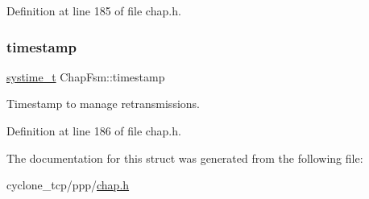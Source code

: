 Definition at line 185 of file chap.\+h.

\mbox{\label{structChapFsm_a7e91539f8fa40405116322e70e810728}} 
\subsubsection{\texorpdfstring{timestamp}{timestamp}}
{\footnotesize\ttfamily \hyperlink{compiler__port_8h_ae3e32a98d431a02106616da3071832dd}{systime\+\_\+t} Chap\+Fsm\+::timestamp}



Timestamp to manage retransmissions. 



Definition at line 186 of file chap.\+h.



The documentation for this struct was generated from the following file\+:\begin{DoxyCompactItemize}
\item 
cyclone\+\_\+tcp/ppp/\hyperlink{chap_8h}{chap.\+h}\end{DoxyCompactItemize}
